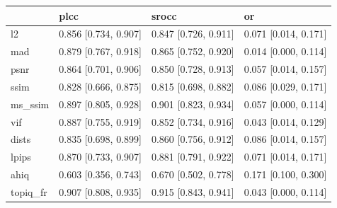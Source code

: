 \begin{tabular}{llll}
\toprule
 & plcc & srocc & or \\
\midrule
l2 & 0.856 [0.734, 0.907] & 0.847 [0.726, 0.911] & 0.071 [0.014, 0.171] \\
mad & 0.879 [0.767, 0.918] & 0.865 [0.752, 0.920] & 0.014 [0.000, 0.114] \\
psnr & 0.864 [0.701, 0.906] & 0.850 [0.728, 0.913] & 0.057 [0.014, 0.157] \\
ssim & 0.828 [0.666, 0.875] & 0.815 [0.698, 0.882] & 0.086 [0.029, 0.171] \\
ms_ssim & 0.897 [0.805, 0.928] & 0.901 [0.823, 0.934] & 0.057 [0.000, 0.114] \\
vif & 0.887 [0.755, 0.919] & 0.852 [0.734, 0.916] & 0.043 [0.014, 0.129] \\
dists & 0.835 [0.698, 0.899] & 0.860 [0.756, 0.912] & 0.086 [0.014, 0.157] \\
lpips & 0.870 [0.733, 0.907] & 0.881 [0.791, 0.922] & 0.071 [0.014, 0.171] \\
ahiq & 0.603 [0.356, 0.743] & 0.670 [0.502, 0.778] & 0.171 [0.100, 0.300] \\
topiq_fr & 0.907 [0.808, 0.935] & 0.915 [0.843, 0.941] & 0.043 [0.000, 0.114] \\
\bottomrule
\end{tabular}

